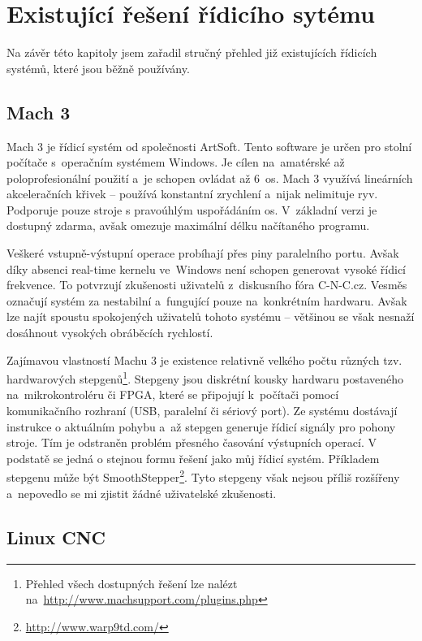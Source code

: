 	\section{Existující řešení řídicího sytému}

	Na závěr této kapitoly jsem zařadil stručný přehled již existujících řídicích systémů, které jsou běžně používány. 
	
		\subsection{Mach 3}
		
		Mach 3 je řídicí systém od společnosti ArtSoft\cite{mach3}. Tento software je určen pro stolní počítače s~operačním systémem Windows. Je cílen na~amatérské až poloprofesionální použití a~je schopen ovládat až 6~os. Mach 3 využívá lineárních akceleračních křivek -- používá konstantní zrychlení a~nijak nelimituje ryv\cite{mach3}. Podporuje pouze stroje s pravoúhlým uspořádáním os.
		V~základní verzi je dostupný zdarma, avšak omezuje maximální délku načítaného programu.
		
		Veškeré vstupně-výstupní operace probíhají přes piny paralelního portu. Avšak díky absenci real-time kernelu ve~Windows není schopen generovat vysoké řídicí frekvence. To potvrzují zkušenosti uživatelů z~diskusního fóra C-N-C.cz\cite{c-n-c}. Vesměs označují systém za nestabilní a~fungující pouze na~konkrétním hardwaru. Avšak lze najít spoustu spokojených uživatelů tohoto systému – většinou se však nesnaží dosáhnout vysokých obráběcích rychlostí.
		
		Zajímavou vlastností Machu 3 je existence relativně velkého počtu různých tzv. hardwarových stepgenů\footnote{Přehled všech dostupných řešení lze nalézt na~\url{http://www.machsupport.com/plugins.php}}. Stepgeny jsou diskrétní kousky hardwaru postaveného na~mikrokontroléru či FPGA, které se připojují k~počítači pomocí komunikačního rozhraní (USB, paralelní či sériový port). Ze systému dostávají instrukce o aktuálním pohybu a~až stepgen generuje řídicí signály pro pohony stroje. Tím je odstraněn problém přesného časování výstupních operací. V podstatě se jedná o stejnou formu řešení jako můj řídicí systém. Příkladem stepgenu může být SmoothStepper\footnote{\url{http://www.warp9td.com/}}. Tyto stepgeny však nejsou příliš rozšířeny a~nepovedlo se mi zjistit žádné uživatelské zkušenosti.
		
		\subsection{Linux CNC}
		
